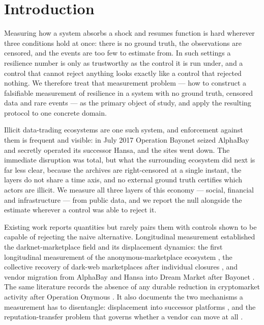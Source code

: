 \section{Introduction}

Measuring how a system absorbs a shock and resumes function is hard wherever
three conditions hold at once: there is no ground truth, the observations are
censored, and the events are too few to estimate from. In such settings a
resilience number is only as trustworthy as the control it is run under, and a
control that cannot reject anything looks exactly like a control that rejected
nothing. We therefore treat that measurement problem --- how to construct a
falsifiable measurement of resilience in a system with no ground truth, censored
data and rare events --- as the primary object of study, and apply the resulting
protocol to one concrete domain.

Illicit data-trading ecosystems are one such system, and enforcement against
them is frequent and visible: in July 2017 Operation Bayonet seized AlphaBay and
secretly operated its successor Hansa, and the sites went down. The immediate
disruption was total, but what the surrounding ecosystem did next is far less
clear, because the archives are right-censored at a single instant, the layers do
not share a time axis, and no external ground truth certifies which actors are
illicit. We measure all three layers of this economy --- social, financial and
infrastructure --- from public data, and we report the null alongside the
estimate wherever a control was able to reject it.

Existing work reports quantities but rarely pairs them with controls shown to be
capable of rejecting the naive alternative. Longitudinal measurement established
the darknet-marketplace field and its displacement dynamics: the first
longitudinal measurement of the anonymous-marketplace ecosystem
\citep{soska2015measuring}, the collective recovery of dark-web marketplaces
after individual closures \citep{elbahrawy2020collective}, and vendor migration
from AlphaBay and Hansa into Dream Market after Bayonet
\citep{vanwegberg2018lost}. The same literature records the absence of any
durable reduction in cryptomarket activity after Operation Onymous
\citep{decaryhetu2017police}. It also documents the two
mechanisms a measurement has to disentangle: displacement into successor
platforms \citep{goonetilleke2023hydra}, and the reputation-transfer problem that
governs whether a vendor can move at all \citep{norbutas2020reputation}.

